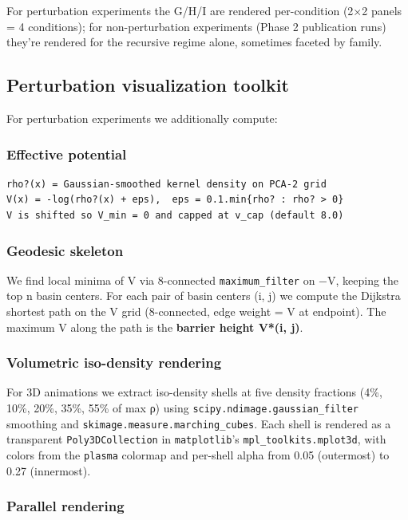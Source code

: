 \documentclass{article}
\theoremstyle{plain}
\theoremstyle{definition}
\begin{document}
For perturbation experiments the G/H/I are rendered per-condition
(2×2 panels = 4 conditions); for non-perturbation experiments (Phase 2
publication runs) they're rendered for the recursive regime alone,
sometimes faceted by family.

\subsection{Perturbation visualization toolkit}

For perturbation experiments we additionally compute:

\subsubsection{Effective potential}

\begin{verbatim}
rho?(x) = Gaussian-smoothed kernel density on PCA-2 grid
V(x) = -log(rho?(x) + eps),  eps = 0.1.min{rho? : rho? > 0}
V is shifted so V_min = 0 and capped at v_cap (default 8.0)
\end{verbatim}

\subsubsection{Geodesic skeleton}

We find local minima of V via 8-connected \texttt{maximum\_filter} on −V,
keeping the top n basin centers. For each pair of basin centers (i, j)
we compute the Dijkstra shortest path on the V grid (8-connected, edge
weight = V at endpoint). The maximum V along the path is the \textbf{barrier
height V*(i, j)}.

\subsubsection{Volumetric iso-density rendering}

For 3D animations we extract iso-density shells at five density
fractions (4\%, 10\%, 20\%, 35\%, 55\% of max ρ) using
\texttt{scipy.ndimage.gaussian\_filter} smoothing and \texttt{skimage.measure.marching\_cubes}.
Each shell is rendered as a transparent \texttt{Poly3DCollection} in
\texttt{matplotlib}'s \texttt{mpl\_toolkits.mplot3d}, with colors from the \texttt{plasma}
colormap and per-shell alpha from 0.05 (outermost) to 0.27 (innermost).

\subsubsection{Parallel rendering}
\end{document}
